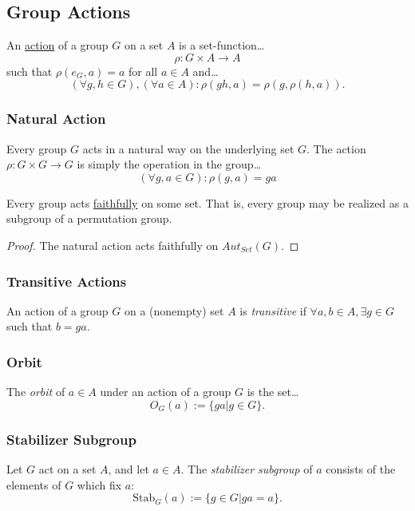 \subsection{Group Actions}\label{groupactions}

An \hyperref[categoricalgroupaction]{action} of a group $G$ on a set $A$ is a set-function\dots
$$\rho : G \times A \rightarrow A$$
such that $\rho (e_G, a) = a$ for all $a \in A$ and\dots
$$(\forall g,h \in G), (\forall a \in A) : \rho(gh,a) = \rho(g, \rho(h,a)).$$

\subsubsection{Natural Action}\label{naturalgroupaction}
Every group $G$ acts in a natural way on the underlying set $G$. The action $\rho : G \times G \rightarrow G$ is simply
the operation in the group\dots
$$(\forall g,a \in G): \rho(g,a) = ga$$

\begin{theorem}
\label{cayleystheorem}
Every group acts \hyperref[faithful]{faithfully} on some set. That is, every group may be realized as a subgroup of a permutation group.
\end{theorem}

\begin{proof}
The natural action acts faithfully on $Aut_{Set}(G)$.
\end{proof}

\subsubsection{Transitive Actions}\label{transitiveactions}
An action of a group $G$ on a (nonempty) set $A$ is \emph{transitive} if $\forall a,b \in A, \exists g \in G$ such that $b = ga$.

\subsubsection{Orbit}\label{orbit}
The \emph{orbit} of $a \in A$ under an action of a group $G$ is the set\dots
$$O_G(a) := \{ ga | g \in G \}.$$

\subsubsection{Stabilizer Subgroup}\label{stabilizer}
Let $G$ act on a set $A$, and let $a \in A$. The \emph{stabilizer subgroup} of $a$ consists of the elements of $G$ which fix $a$:
$$\textrm{Stab}_G(a) := \{ g \in G | ga = a \}.$$

